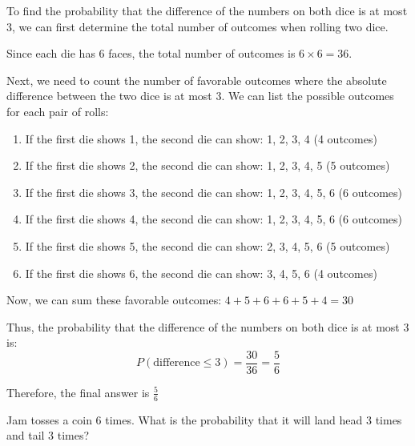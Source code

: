\documentclass[a4paper, 10pt]{article}
\begin{document}
\begin{solution}
To find the probability that the difference of the numbers on both dice is at most 3,
we can first determine the total number of outcomes when rolling two dice.
\\
\par Since each die has 6 faces, the total number of outcomes is \( 6 \times 6 = 36 \).
\\
\par Next, we need to count the number of favorable outcomes where the absolute difference between the two dice is at most 3.
We can list the possible outcomes for each pair of rolls:
\begin{enumerate}
    \item If the first die shows 1, the second die can show: 1, 2, 3, 4 (4 outcomes)
    \item If the first die shows 2, the second die can show: 1, 2, 3, 4, 5 (5 outcomes)
    \item If the first die shows 3, the second die can show: 1, 2, 3, 4, 5, 6 (6 outcomes)
    \item If the first die shows 4, the second die can show: 1, 2, 3, 4, 5, 6 (6 outcomes)
    \item If the first die shows 5, the second die can show: 2, 3, 4, 5, 6 (5 outcomes)
    \item If the first die shows 6, the second die can show: 3, 4, 5, 6 (4 outcomes)
\end{enumerate}

Now, we can sum these favorable outcomes: \( 4 + 5 + 6 + 6 + 5 + 4 = 30 \)

Thus, the probability that the difference of the numbers on both dice is at most 3 is:
\[
P(\text{difference} \leq 3) = \frac{30}{36} = \frac{5}{6}
\]

Therefore, the final answer is \( \boxed{\frac{5}{6}} \)
\end{solution}


\begin{problem}
Jam tosses a coin 6 times.
What is the probability that it will land head 3 times and tail 3 times?
\end{problem}
\end{document}
